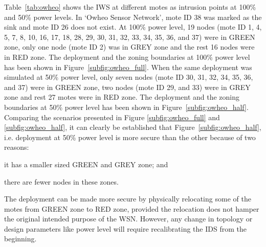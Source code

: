 \documentclass[conference,manuscript]{IEEEtran}
\newcommand{\notedme}[1]{\raisebox{0pt}[0pt][0pt]{\pdfcomment[open=true,color=blue]{#1}}}
\begin{document}
Table~\ref{tab:owheo} shows the IWS at different motes as intrusion points at 100\% and 50\% power levels. 
In `Owheo Sensor Network', mote ID 38 was marked as the sink and mote ID 26 does not exist.
At 100\% power level, 19 nodes (mote ID 1, 4, 5, 7, 8, 10, 16, 17, 18, 28, 29, 30, 31, 32, 33, 34, 35, 36, and 37) were in GREEN zone, only one node (mote ID 2) was in GREY zone and the rest 16 nodes were in RED zone.
The deployment and the zoning boundaries at 100\% power level has been shown in Figure~\ref{subfig:owheo_full}.
When the same deployment was simulated at 50\% power level, only seven nodes (mote ID 30, 31, 32, 34, 35, 36, and 37) were in GREEN zone, two nodes (mote ID 29, and 33) were in GREY zone and rest 27 motes were in RED zone.
The deployment and the zoning boundaries at 50\% power level has been shown in Figure~\ref{subfig:owheo_half}.
Comparing the scenarios presented in  Figure \ref{subfig:owheo_full} and \ref{subfig:owheo_half}, it can clearly be established that Figure~\ref{subfig:owheo_half}, i.e. deployment at 50\% power level is more secure than the other because of two reasons:
\begin{inparaenum}
\item it has a smaller sized GREEN and GREY zone; and 
\item there are fewer nodes in these zones. 
\end{inparaenum}
The deployment can be made more secure by physically relocating some of the motes from GREEN zone to RED zone, provided the relocation does not hamper the original intended purpose of the WSN.
However, any change in topology or design parameters like power level will require recalibrating the IDS from the beginning. 
\end{document}
